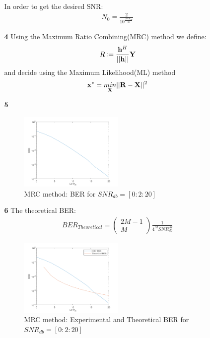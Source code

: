 \documentclass[12pt]{article}
\begin{document}
\begin{enumerate}
\begin{enumerate}
			In order to get the desired SNR:
			\begin{align*}
				N_0 = \frac{2}{10^{\frac{SNR_{db}}{10}}}
			\end{align*}
		
			\item[\bf 4]
			Using the Maximum Ratio Combining(MRC) method we define:
			\begin{align*}
				R\coloneqq\frac{{\bf h}^H}{||{\bf h||}}{\bf Y}
			\end{align*}
			and decide using the Maximum Likelihood(ML) method
			\begin{align*}
				{\bf x}^* = \underset{{\bf X}}{min}||{\bf R}-{\bf X}||^2
			\end{align*}
		
			\newpage
			\item[\bf 5]
			\begin{figure}[h!]
				\centering
				\includegraphics[width=0.5\textwidth]{fig1.png}
				\caption{MRC method: BER for $SNR_{db}=[0:2:20]$}
			\end{figure}
			
			
			\item[\bf 6]
			The theoretical BER:
			\begin{align*}
				BER_{Theoretical}=\begin{pmatrix}
					2M-1 \\ M
				\end{pmatrix}\frac{1}{4^MSNR_{db}^M}
			\end{align*}
			\begin{figure}[h!]
				\centering
				\includegraphics[width=0.5\textwidth]{fig2.png}
				\caption{MRC method: Experimental and Theoretical BER for $SNR_{db}=[0:2:20]$}
			\end{figure}
		

\end{enumerate}
\end{enumerate}
\end{document}
